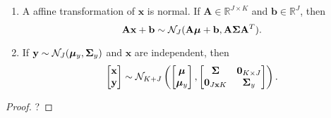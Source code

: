 \begin{theorem}
\begin{enumerate}
        \item
            A affine transformation of $\mathbf{x}$ is normal.
            If $\mathbf{A} \in \mathbb{R}^{J \times K}$ and $\mathbf{b} \in \mathbb{R}^{J}$, then
            \begin{equation*}
                \mathbf{Ax} + \mathbf{b} \sim \mathcal{N}_J(
                \mathbf{A} \boldsymbol{\mu} + \mathbf{b},
                \mathbf{A} \boldsymbol{\Sigma} \mathbf{A}^{T}
                ).
            \end{equation*}

        \item
            If $\mathbf{y} \sim \mathcal{N}_J( \boldsymbol{\mu}_y, \boldsymbol{\Sigma}_{y})$ and $\mathbf{x}$ are independent, then
            \begin{equation*}
                \begin{bmatrix}
                    \mathbf{x} \\ \mathbf{y}
                \end{bmatrix} \sim \mathcal{N}_{K + J} \left(
                \begin{bmatrix}
                    \boldsymbol{\mu} \\ \boldsymbol{\mu}_{y}
                \end{bmatrix},
                \begin{bmatrix}
                    \boldsymbol{\Sigma} & \mathbf{0}_{K \times J} \\
                    \mathbf{0}_{J \mathbf{x} K} & \boldsymbol{\Sigma}_y
                \end{bmatrix}\right).
            \end{equation*}
    \end{enumerate}
\end{theorem}
\begin{proof}
    ?
\end{proof}
